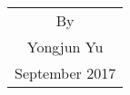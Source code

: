 \begin{titlepage}
\begin{center}
		\vspace{4cm}
		{\sanhao
			\begin{center} \renewcommand{\arraystretch}{1.5}
				\begin{tabular}{c}
					By \\
					Yongjun Yu \\
					September 2017 \\
				\end{tabular} \renewcommand{\arraystretch}{1}
			\end{center} 
		}
	\end{center}
	\clearpage{\pagestyle{empty}\cleardoublepage}
\end{titlepage}
